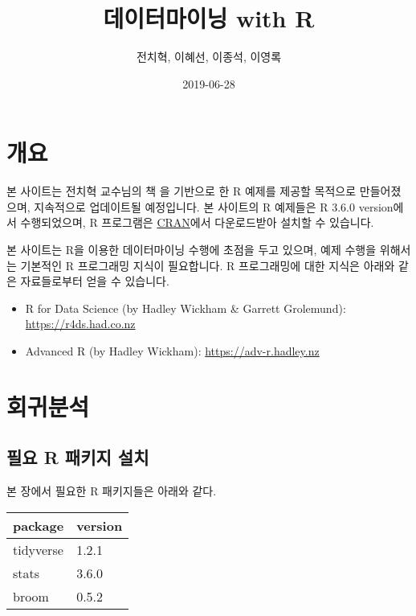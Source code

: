 \documentclass[]{book}
\title{데이터마이닝 with R}
\author{전치혁, 이혜선, 이종석, 이영록}
\date{2019-06-28}
\providecommand{\tightlist}{%
  \setlength{\itemsep}{0pt}\setlength{\parskip}{0pt}}
\begin{document}
\maketitle

{
\setcounter{tocdepth}{1}
\tableofcontents
}
\chapter*{개요}

본 사이트는 전치혁 교수님의 책 \href{http://www.hannarae.net/books/area.php?ptype=view\&prdcode=1409250010}{}을 기반으로 한 R 예제를 제공할 목적으로 만들어졌으며, 지속적으로 업데이트될 예정입니다. 본 사이트의 R 예제들은 R 3.6.0 version에서 수행되었으며, R 프로그램은 \href{https://cran.r-project.org}{CRAN}에서 다운로드받아 설치할 수 있습니다.

본 사이트는 R을 이용한 데이터마이닝 수행에 초점을 두고 있으며, 예제 수행을 위해서는 기본적인 R 프로그래밍 지식이 필요합니다. R 프로그래밍에 대한 지식은 아래와 같은 자료들로부터 얻을 수 있습니다.

\begin{itemize}
\tightlist
\item
  R for Data Science (by Hadley Wickham \& Garrett Grolemund): \url{https://r4ds.had.co.nz}
\item
  Advanced R (by Hadley Wickham): \url{https://adv-r.hadley.nz}
\end{itemize}

\hypertarget{regression}{%
\chapter{회귀분석}\label{regression}}

\hypertarget{regression-packages-install}{%
\section{필요 R 패키지 설치}\label{regression-packages-install}}

본 장에서 필요한 R 패키지들은 아래와 같다.

\begin{tabular}{l|l}
\hline
package & version\\
\hline
tidyverse & 1.2.1\\
\hline
stats & 3.6.0\\
\hline
broom & 0.5.2\\
\hline
\end{tabular}
\end{document}
